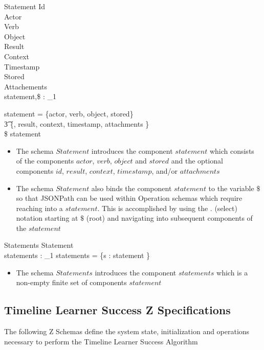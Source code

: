 \documentclass{article}
\begin{document}
  \begin{schema}{Statement}
    Id \\
    Actor \\
    Verb \\
    Object \\
    Result \\
    Context \\
    Timestamp \\
    Stored \\
    Attachements \\
    statement,\$ : \finset_1

    \where
    statement = \{actor, verb, object, stored\} \cup \\\t3 \power \{\id,
    result, context, timestamp, attachments \} \\
    \$ \bind statement
  \end{schema}
  \begin{itemize}
  \item The schema $Statement$ introduces the component $statement$
    which consists of the components $actor$, $verb$, $object$ and
    $stored$ and the optional components $id$, $result$, $context$,
    $timestamp$, and/or $attachments$
  \item The schema $Statement$ also binds the component $statement$ to
    the variable $\$$ so that JSONPath can be used within Operation
    schemas which require reaching into a $statement$. This is
    accomplished by using the $.$ (select) notation starting at $\$$
    (root) and navigating into subsequent components of the $statement$
  \end{itemize}

  \begin{schema}{Statements}
    Statement \\
    statements : \finset_1
    \where
    statements = \{s : statement \}
  \end{schema}
  \begin{itemize}
  \item The schema $Statements$ introduces the component $statements$
    which is a non-empty finite set of components $statement$
 \end{itemize}

 \subsection{Timeline Learner Success Z Specifications}
 The following Z Schemas define the system state, initialization and
 operations necessary to perform the Timeline Learner Success Algorithm
\end{document}

